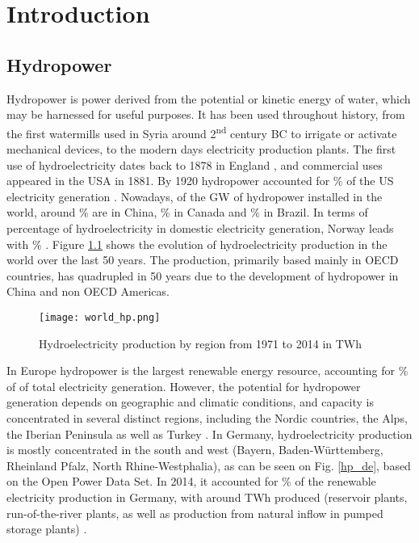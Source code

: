 \chapter{Introduction}
\label{chap:introduction}


\section{Hydropower}

Hydropower is power derived from the potential or kinetic energy of water, which may be harnessed for useful purposes. It has been used throughout history, from the first watermills used in Syria around 2\textsuperscript{nd} century BC \cite{reynolds} to irrigate or activate mechanical devices, to the modern days electricity production plants. The first use of hydroelectricity dates back to 1878 in England \cite{indus_arch}, and commercial uses appeared in the USA in 1881. By 1920 hydropower accounted for \unit[25]{\%} of the US electricity generation \cite{hist_hyd}. \newline
Nowadays, of the \unit[1171]{GW} of hydropower installed in the world, around \unit[27]{\%} are in China, \unit[10]{\%} in Canada and \unit[9]{\%} in Brazil. In terms of percentage of hydroelectricity in domestic electricity generation, Norway leads with \unit[96]{\%} \cite{iea_stat}. Figure \ref{world_hp} shows the evolution of hydroelectricity production in the world over the last 50 years. The production, primarily based mainly in OECD countries, has quadrupled in 50 years due to the development of hydropower in China and non OECD Americas.

\begin{figure}[H]
\centering
\texttt{[image: world\_hp.png]}
\caption[Hydroelectricity production by region from 1971 to 2014 in TWh]{Hydroelectricity production by region from 1971 to 2014 in TWh \cite{iea_stat}}
\label{world_hp}
\end{figure}

In Europe hydropower is the largest renewable energy resource, accounting for \unit[18]{\%} of of total electricity generation. However, the potential for hydropower generation depends on geographic and climatic conditions, and capacity is concentrated in several distinct regions, including the Nordic countries, the Alps, the Iberian Peninsula as well as Turkey \cite{hp_europe}. \newline
In Germany, hydroelectricity production is mostly concentrated in the south and west (Bayern, Baden-Württemberg, Rheinland Pfalz, North Rhine-Westphalia), as can be seen on Fig. \ref{hp_de}, based on the Open Power Data Set. In 2014, it accounted for \unit[12]{\%} of the renewable electricity production in Germany, with around \unit[20]{TWh} produced (reservoir plants, run-of-the-river plants, as well as production from natural inflow in pumped storage plants) \cite{bdew}.

